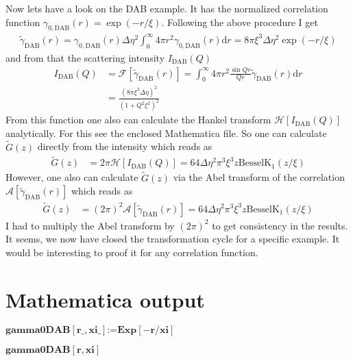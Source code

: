 \documentclass[12pt]{amsbook}
\begin{document}
Now lets have a look on the DAB example. It has the normalized correlation function $\gamma_{0,\mathrm{DAB}}(r)=\exp (-r/\xi)$. Following the above procedure I get
\begin{align}
\tilde{\gamma}_\mathrm{DAB}(r)= \gamma_{0,\mathrm{DAB}}(r) \Delta\eta^2 \int_0^\infty 4\pi r^2 \gamma_{0,\mathrm{DAB}}(r) \mathrm{d}r = 8\pi\xi^3\Delta\eta^2\exp(-r/\xi)
\end{align}
and from that the scattering intensity $I_\mathrm{DAB}(Q)$
\begin{align}
I_\mathrm{DAB}(Q) &= \mathcal{F}[\tilde{\gamma}_\mathrm{DAB}(r)] = \int_0^\infty 4\pi r^2 \frac{\sin Qr}{Qr} \tilde{\gamma}_\mathrm{DAB}(r) \mathrm{d}r \\
&= \frac{(8\pi\xi^3\Delta\eta)^2}{\left(1+Q^2\xi^2\right)^2}
\end{align}
From this function one also can calculate the Hankel transform $\mathcal{H}[I_\mathrm{DAB}(Q)]$ analytically. For this see the enclosed Mathematica file. So one can calculate $\tilde{G}(z)$ directly from the intensity which reads as
\begin{align}
\tilde{G}(z) &= 2\pi \mathcal{H}[I_\mathrm{DAB}(Q)] = 64\Delta\eta^2\pi^3\xi^3 z \mathrm{BesselK}_1(z/\xi)
\end{align}
However, one also can calculate $\tilde{G}(z)$ via the Abel transform of the correlation $\mathcal{A}[\tilde{\gamma}_\mathrm{DAB}(r)]$ which reads as
\begin{align}
\tilde{G}(z) &= (2\pi)^2 \mathcal{A}[\tilde{\gamma}_\mathrm{DAB}(r)] = 64\Delta\eta^2\pi^3\xi^3 z \mathrm{BesselK}_1(z/\xi)
\end{align}
I had to multiply the Abel transform by $(2\pi)^2$ to get consistency in the results. It seems, we now have closed the transformation cycle for a specific example. It would be interesting to proof it for any correlation function.


\section{Mathematica output}
\begin{doublespace}
\noindent\(\pmb{\text{gamma0DAB}[\text{r$\_$},\text{xi$\_$}]\text{:=}\text{Exp}[-r/\text{xi}]}\)
\end{doublespace}

\begin{doublespace}
\noindent\(\pmb{\text{gamma0DAB}[r,\text{xi}]}\)
\end{doublespace}
\end{document}
